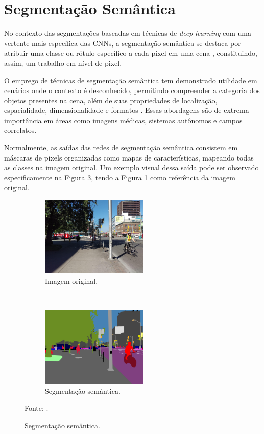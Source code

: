 \clearpage
\newpage


\section{Segmentação Semântica}
\label{semantic}
No contexto das segmentações baseadas em técnicas de \textit{deep learning} com uma vertente mais específica das CNNs, a segmentação semântica se destaca por atribuir uma classe ou rótulo específico a cada pixel em uma cena \citep{Wang2017, Ghosh2019, Shelhamer2016, Arbelaez2012, Zhang2018}, constituindo, assim, um trabalho em nível de pixel.

O emprego de técnicas de segmentação semântica tem demonstrado utilidade em cenários onde o contexto é desconhecido, permitindo compreender a categoria dos objetos presentes na cena, além de suas propriedades de localização, espacialidade, dimensionalidade e formatos \citep{Zhang2018}. Essas abordagens são de extrema importância em áreas como imagens médicas, sistemas autônomos e campos correlatos.

Normalmente, as saídas das redes de segmentação semântica consistem em máscaras de pixels organizadas como mapas de características, mapeando todas as classes na imagem original. Um exemplo visual dessa saída pode ser observado especificamente na Figura \ref{semantic:fig:3.2}, tendo a Figura \ref{semantic:fig:3.1} como referência da imagem original.

\begin{figure}[H]
   \caption{Segmentação semântica.}
   \centering
   \label{semantic:fig:3}
    \begin{subfigure}[t]{0.45\textwidth}
        \centering
        \includegraphics[height=1.5in]{recursos/imagens/semantic/t1.jpg}
        \caption{Imagem original.}
        \label{semantic:fig:3.1}
    \end{subfigure}%
    ~ 
    \begin{subfigure}[t]{0.45\textwidth}
        \centering
        \includegraphics[height=1.5in]{recursos/imagens/semantic/s1.png}
        \caption{Segmentação semântica.}
        \label{semantic:fig:3.2}
    \end{subfigure}%

    Fonte: \cite{Neuhold2017_ICCV}.
\end{figure}

